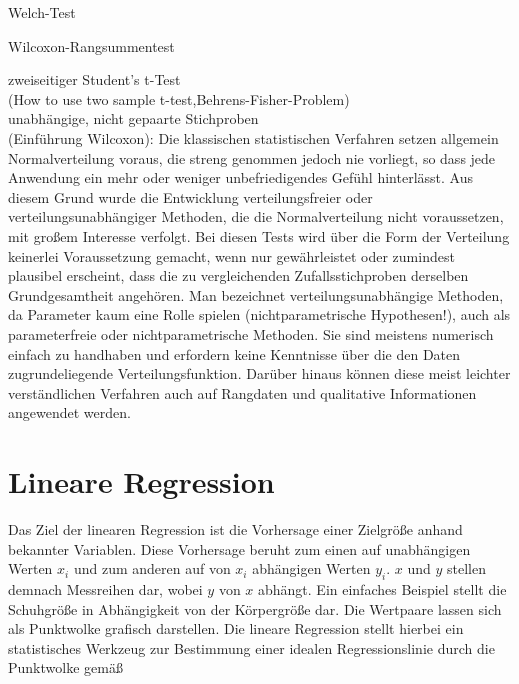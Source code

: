 Welch-Test

Wilcoxon-Rangsummentest

zweiseitiger Student's t-Test\\

\parencite{hedderich_angewandte_2016}
\parencite{cressie_how_1986}
(How to use two sample t-test,Behrens-Fisher-Problem)\\

unabhängige, nicht gepaarte Stichproben\\






(Einführung Wilcoxon):
Die klassischen statistischen Verfahren setzen allgemein Normalverteilung voraus, die streng genommen
jedoch nie vorliegt, so dass jede Anwendung ein mehr oder weniger unbefriedigendes
Gefühl hinterlässt. Aus diesem Grund wurde die Entwicklung verteilungsfreier oder verteilungsunabhängiger
Methoden, die die Normalverteilung nicht voraussetzen, mit großem Interesse verfolgt.
Bei diesen Tests wird über die Form der Verteilung keinerlei Voraussetzung gemacht, wenn
nur gewährleistet oder zumindest plausibel erscheint, dass die zu vergleichenden Zufallsstichproben
derselben Grundgesamtheit angehören. Man bezeichnet verteilungsunabhängige Methoden,
da Parameter kaum eine Rolle spielen (nichtparametrische Hypothesen!), auch als parameterfreie
oder nichtparametrische Methoden. Sie sind meistens numerisch einfach zu handhaben
und erfordern keine Kenntnisse über die den Daten zugrundeliegende Verteilungsfunktion.
Darüber hinaus können diese meist leichter verständlichen Verfahren auch auf Rangdaten und
qualitative Informationen angewendet werden.

\section{Lineare Regression}

Das Ziel der linearen Regression ist die Vorhersage einer Zielgröße anhand bekannter Variablen. Diese Vorhersage beruht zum einen auf unabhängigen Werten $x_i$ und zum anderen auf von $x_i$ abhängigen Werten $y_i$. $x$ und $y$ stellen demnach Messreihen dar, wobei $y$ von $x$ abhängt. Ein einfaches Beispiel stellt die Schuhgröße in Abhängigkeit von der Körpergröße dar. Die Wertpaare lassen sich als Punktwolke grafisch darstellen. Die lineare Regression stellt hierbei ein statistisches Werkzeug zur Bestimmung einer idealen Regressionslinie durch die Punktwolke gemäß

